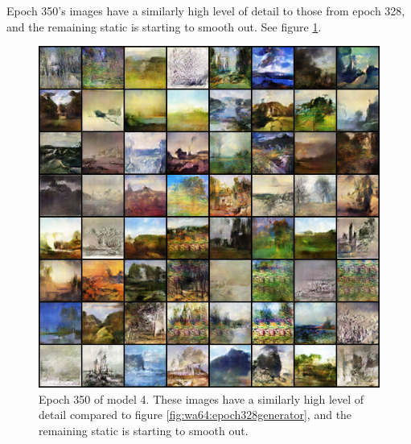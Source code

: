 \documentclass[11pt,letterpaper]{article}
\begin{document}
				Epoch 350's images have a similarly high level of detail to those from epoch 328, and the remaining static is starting to smooth out.
				See figure \ref{fig:wa64:epoch350generator}.
				\begin{figure}
					\centering
					\includegraphics[width=1.0\linewidth]{results/model4/epoch350_generator}
					\caption{Epoch 350 of model 4. These images have a similarly high level of detail compared to figure \ref{fig:wa64:epoch328generator}, and the remaining static is starting to smooth out.}
					\label{fig:wa64:epoch350generator}
				\end{figure}
\end{document}
